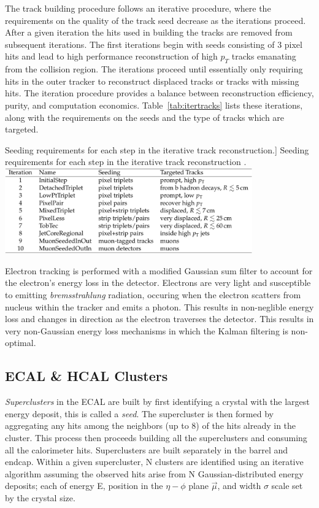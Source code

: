 The track building procedure follows an iterative procedure, where the requirements on the quality of the track seed decrease as the iterations proceed. After a given iteration the hits used in building the tracks are removed from subsequent iterations. The first iterations begin with seeds consisting of 3 pixel hits and lead to high performance reconstruction of high $p_{T}$ tracks emanating from the collision region. The iterations proceed until essentially only requiring hits in the outer tracker to reconstruct displaced tracks or tracks with missing hits. The iteration procedure provides a balance between reconstruction efficiency, purity, and computation economics. Table~\ref{tab:itertracks} lists these iterations, along with the requirements on the seeds and the type of tracks which are targeted.

\begin{table}[hbp!]
\caption
[Seeding requirements for each step in the iterative track reconstruction.]
{Seeding requirements for each step in the iterative track reconstruction \cite{CMS-PRF-14-001}.}
\centering
\includegraphics[width=0.8\textwidth]{figs/itertracks.png}
\label{tab:itertracks}
\end{table}

Electron tracking is performed with a modified Gaussian sum filter to account for the electron's energy loss in the detector. Electrons are very light and susceptible to emitting \textit{bremsstrahlung} radiation, occuring when the electron scatters from nucleus within the tracker and emits a photon. This results in non-neglible energy loss and changes in direction as the electron traverses the detector. This results in very non-Gaussian energy loss mechanisms in which the Kalman filtering is non-optimal.

\subsection{ECAL \& HCAL Clusters}

\textit{Superclusters} in the ECAL are built by first identifying a crystal with the largest energy deposit, this is called a \textit{seed}. The supercluster is then formed by aggregating any hits among the neighbors (up to 8) of the hits already in the cluster. This process then proceeds building all the superclusters and consuming all the calorimeter hits. Superclusters are built separately in the barrel and endcap. Within a given supercluster, N clusters are identified using an iterative algorithm assuming the observed hits arise from N Gaussian-distributed energy deposits; each of energy E, position in the $\eta-\phi$ plane $\vec{\mu}$, and width $\sigma$ scale set by the crystal size.

